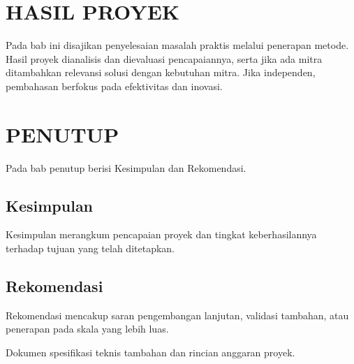 \documentclass[proyek,laporan]{itkta2025}
\begin{document}
\chapter{HASIL PROYEK}
Pada bab ini disajikan penyelesaian masalah praktis melalui penerapan metode. Hasil proyek dianalisis dan dievaluasi pencapaiannya, serta jika ada mitra ditambahkan relevansi solusi dengan kebutuhan mitra. Jika independen, pembahasan berfokus pada efektivitas dan inovasi.

\chapter{PENUTUP}
Pada bab penutup berisi Kesimpulan dan Rekomendasi.

\section{Kesimpulan}
Kesimpulan merangkum pencapaian proyek dan tingkat keberhasilannya terhadap tujuan yang telah ditetapkan.

\section{Rekomendasi}
Rekomendasi mencakup saran pengembangan lanjutan, validasi tambahan, atau penerapan pada skala yang lebih luas.

\clearpage
{}
{}
\renewcommand{\bibname}{DAFTAR PUSTAKA}
\begin{singlespace}
  
  
\end{singlespace}

Dokumen spesifikasi teknis tambahan dan rincian anggaran proyek.


\makebackcoverandspine
\end{document}
